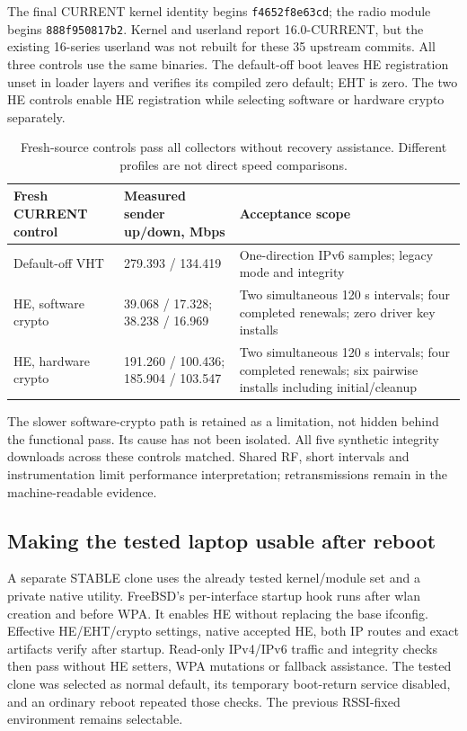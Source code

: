 \documentclass[11pt,letterpaper,oneside]{article}
\newcommand{\code}[1]{\texttt{\small #1}}
\begin{document}
The final CURRENT kernel identity begins \code{f4652f8e63cd}; the radio module begins \code{888f950817b2}. Kernel and userland report 16.0-CURRENT, but the existing 16-series userland was not rebuilt for these 35 upstream commits. All three controls use the same binaries. The default-off boot leaves HE registration unset in loader layers and verifies its compiled zero default; EHT is zero. The two HE controls enable HE registration while selecting software or hardware crypto separately.

\begin{table}[H]\small\centering
\begin{tabularx}{\linewidth}{lYY}\toprule
Fresh CURRENT control & Measured sender up/down, Mbps & Acceptance scope\\\midrule
Default-off VHT & 279.393 / 134.419 & One-direction IPv6 samples; legacy mode and integrity\\
HE, software crypto & 39.068 / 17.328; 38.238 / 16.969 & Two simultaneous 120 s intervals; four completed renewals; zero driver key installs\\
HE, hardware crypto & 191.260 / 100.436; 185.904 / 103.547 & Two simultaneous 120 s intervals; four completed renewals; six pairwise installs including initial/cleanup\\\bottomrule
\end{tabularx}\caption{Fresh-source controls pass all collectors without recovery assistance. Different profiles are not direct speed comparisons.}\end{table}
The slower software-crypto path is retained as a limitation, not hidden behind the functional pass. Its cause has not been isolated. All five synthetic integrity downloads across these controls matched. Shared RF, short intervals and instrumentation limit performance interpretation; retransmissions remain in the machine-readable evidence.

\subsection{Making the tested laptop usable after reboot}
A separate STABLE clone uses the already tested kernel/module set and a private native utility. FreeBSD's per-interface startup hook runs after wlan creation and before WPA. It enables HE without replacing the base ifconfig. Effective HE/EHT/crypto settings, native accepted HE, both IP routes and exact artifacts verify after startup. Read-only IPv4/IPv6 traffic and integrity checks then pass without HE setters, WPA mutations or fallback assistance. The tested clone was selected as normal default, its temporary boot-return service disabled, and an ordinary reboot repeated those checks. The previous RSSI-fixed environment remains selectable.
\end{document}
